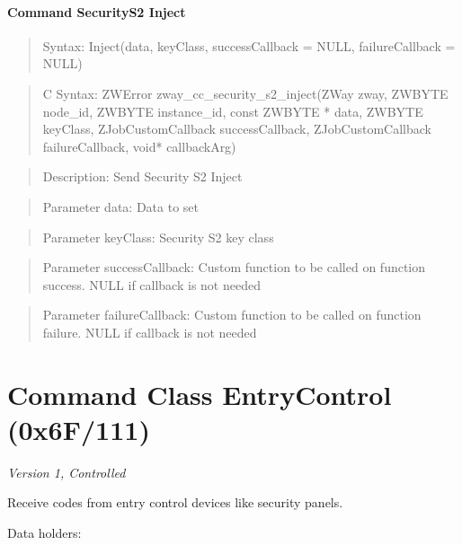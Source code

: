 \paragraph{Command SecurityS2 Inject}
\begin{quote}Syntax: Inject(data, keyClass, successCallback = NULL, failureCallback = NULL)\end{quote}
\begin{quote}C Syntax: ZWError zway\_cc\_security\_s2\_inject(ZWay zway, ZWBYTE node\_id, ZWBYTE instance\_id, const ZWBYTE * data, ZWBYTE keyClass, ZJobCustomCallback successCallback, ZJobCustomCallback failureCallback, void* callbackArg)\end{quote}
\begin{quote}Description: Send Security S2 Inject\end{quote}
\begin{quote}Parameter data: Data to set\end{quote}
\begin{quote}Parameter keyClass: Security S2 key class\end{quote}
\begin{quote}Parameter successCallback: Custom function to be called on function success. NULL if callback is not needed\end{quote}
\begin{quote}Parameter failureCallback: Custom function to be called on function failure. NULL if callback is not needed\end{quote}



\section{Command Class EntryControl (0x6F/111)}

\textit{Version 1, Controlled}
\newline

Receive codes from entry control devices like security panels.
\newline

\noindent
Data holders:

